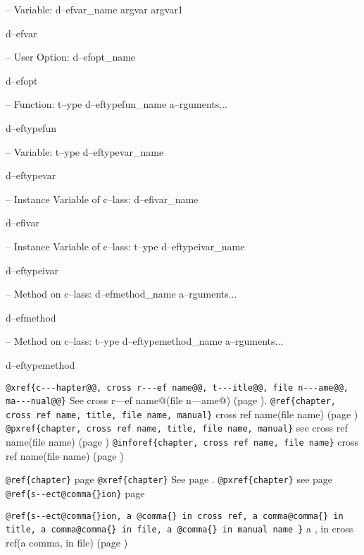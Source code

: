 \documentclass{book}
\begin{document}
\hbox{}-- Variable: d--efvar\_name argvar argvar1


d--efvar

\hbox{}-- User Option: d--efopt\_name


d--efopt

\hbox{}-- Function: t--ype d--eftypefun\_name a--rguments...


d--eftypefun

\hbox{}-- Variable: t--ype d--eftypevar\_name


d--eftypevar

\hbox{}-- Instance Variable of c--lass: d--efivar\_name


d--efivar

\hbox{}-- Instance Variable of c--lass: t--ype d--eftypeivar\_name


d--eftypeivar

\hbox{}-- Method on c--lass: d--efmethod\_name a--rguments...


d--efmethod

\hbox{}-- Method on c--lass: t--ype d--eftypemethod\_name a--rguments...


d--eftypemethod

\texttt{@xref\{c{-}{-}{-}hapter@@, cross r{-}{-}{-}ef name@@, t{-}{-}{-}itle@@, file n{-}{-}{-}ame@@, ma{-}{-}{-}nual@@\}} See cross r---ef name@(file n---ame@) (page \pageref{anchor:c_002d_002d_002dhapter_0040}).
\texttt{@ref\{chapter, cross ref name, title, file name, manual\}} cross ref name(file name) (page \pageref{anchor:chapter})
\texttt{@pxref\{chapter, cross ref name, title, file name, manual\}} see cross ref name(file name) (page \pageref{anchor:chapter})
\texttt{@inforef\{chapter, cross ref name, file name\}} cross ref name(file name) (page \pageref{anchor:chapter})

\texttt{@ref\{chapter\}} page \pageref{anchor:chapter}
\texttt{@xref\{chapter\}} See page \pageref{anchor:chapter}.
\texttt{@pxref\{chapter\}} see page \pageref{anchor:chapter}
\texttt{@ref\{s{-}{-}ect@comma\{\}ion\}} page \pageref{anchor:s_002d_002dect_002cion}

\texttt{@ref\{s{-}{-}ect@comma\{\}ion, a @comma\{\} in cross
ref, a comma@comma\{\} in title, a comma@comma\{\} in file, a @comma\{\} in manual name \}}
a , in cross
ref(a comma, in file) (page \pageref{anchor:s_002d_002dect_002cion})
\end{document}
